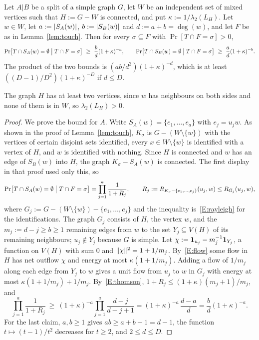\begin{lemma}\label{lem:touch-flow}
Let $A|B$ be a split of a simple graph $G$, let $W$ be an independent set of mixed vertices such that $H:=G-W$ is connected, and put $\kappa:=1/\lambda_2(L_H)$. Let $w\in W$, let $a:=\lvert S_A(w)\rvert$, $b:=\lvert S_B(w)\rvert$ and $d:=a+b=\deg(w)$, and let $F$ be as in Lemma~\ref{lem:touch}. Then for every $\sigma\subseteq F$ with $\Pr[T\cap F=\sigma]>0$,
\[
  \Pr\bigl[T\cap S_A(w)=\emptyset\bigm|T\cap F=\sigma\bigr]\ \ge\ \frac bd(1+\kappa)^{-a},\qquad\Pr\bigl[T\cap S_B(w)=\emptyset\bigm|T\cap F=\sigma\bigr]\ \ge\ \frac ad(1+\kappa)^{-b}.
\]
The product of the two bounds is $(ab/d^2)(1+\kappa)^{-d}$, which is at least $((D-1)/D^2)(1+\kappa)^{-D}$ if $d\le D$.
\end{lemma}

The graph $H$ has at least two vertices, since $w$ has neighbours on both sides and none of them is in $W$, so $\lambda_2(L_H)>0$.

\begin{proof}
We prove the bound for $A$. Write $S_A(w)=\{e_1,\dots,e_a\}$ with $e_j=u_jw$. As shown in the proof of Lemma~\ref{lem:touch}, $K_\sigma$ is $G-(W\setminus\{w\})$ with the vertices of certain disjoint sets identified, every $x\in W\setminus\{w\}$ is identified with a vertex of $H$, and $w$ is identified with nothing. Since $H$ is connected and $w$ has an edge of $S_B(w)$ into $H$, the graph $K_\sigma-S_A(w)$ is connected. The first display in that proof used only this, so
\[
  \Pr\bigl[T\cap S_A(w)=\emptyset\bigm|T\cap F=\sigma\bigr]=\prod_{j=1}^a\frac1{1+R_j},\qquad R_j:=R_{K_\sigma-\{e_1,\dots,e_j\}}(u_j,w)\le R_{G_j}(u_j,w),
\]
where $G_j:=G-(W\setminus\{w\})-\{e_1,\dots,e_j\}$ and the inequality is~\ref{E:rayleigh} for the identifications. The graph $G_j$ consists of $H$, the vertex $w$, and the $m_j:=d-j\ge b\ge1$ remaining edges from $w$ to the set $Y_j\subseteq V(H)$ of its remaining neighbours; $u_j\notin Y_j$ because $G$ is simple. Let $\chi:=\mathbf{1}_{u_j}-m_j^{-1}\mathbf{1}_{Y_j}$, a function on $V(H)$ with sum $0$ and $\lVert \chi\rVert^2=1+1/m_j$. By~\ref{E:flow} some flow in $H$ has net outflow $\chi$ and energy at most $\kappa(1+1/m_j)$. Adding a flow of $1/m_j$ along each edge from $Y_j$ to $w$ gives a unit flow from $u_j$ to $w$ in $G_j$ with energy at most $\kappa(1+1/m_j)+1/m_j$. By~\ref{E:thomson}, $1+R_j\le(1+\kappa)(m_j+1)/m_j$, and
\[
  \prod_{j=1}^a\frac1{1+R_j}\ \ge\ (1+\kappa)^{-a}\prod_{j=1}^a\frac{d-j}{d-j+1}=(1+\kappa)^{-a}\,\frac{d-a}d=\frac bd(1+\kappa)^{-a}.
\]
For the last claim, $a,b\ge1$ gives $ab\ge a+b-1=d-1$, the function $t\mapsto(t-1)/t^2$ decreases for $t\ge2$, and $2\le d\le D$.
\end{proof}

